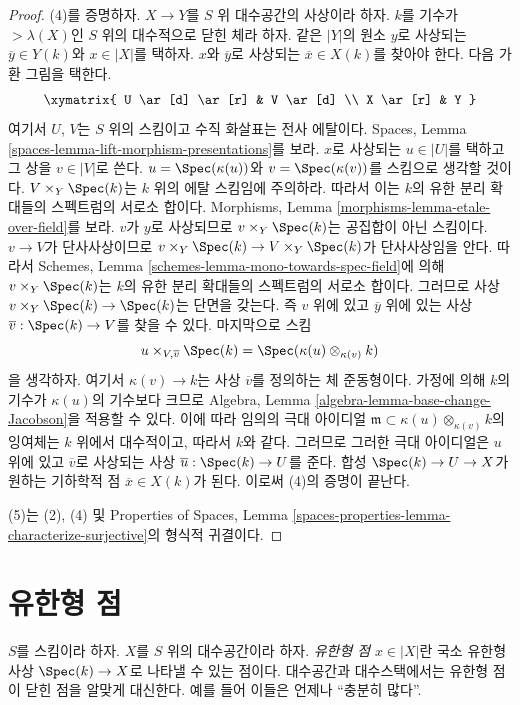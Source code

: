 \begin{proof}
\medskip\noindent
(4)를 증명하자. $X \to Y$를 $S$ 위 대수공간의 사상이라 하자.
$k$를 기수가 $> \lambda(X)$인 $S$ 위의 대수적으로 닫힌 체라 하자.
같은 $|Y|$의 원소 $y$로 사상되는 $\overline{y} \in Y(k)$와
$x \in |X|$를 택하자.
$x$와 $\overline{y}$로 사상되는 $\overline{x} \in X(k)$를 찾아야 한다.
다음 가환 그림을 택한다.
$$
\xymatrix{
U \ar[d] \ar[r] & V \ar[d] \\
X \ar[r] & Y
}
$$
여기서 $U$, $V$는 $S$ 위의 스킴이고 수직 화살표는 전사 에탈이다.
Spaces, Lemma \ref{spaces-lemma-lift-morphism-presentations}를 보라.
$x$로 사상되는 $u \in |U|$를 택하고 그 상을 $v \in |V|$로 쓴다.
$u = \Spec(\kappa(u))$와 $v = \Spec(\kappa(v))$를 스킴으로 생각할 것이다.
$V \times_Y \Spec(k)$는 $k$ 위의 에탈 스킴임에 주의하라.
따라서 이는 $k$의 유한 분리 확대들의 스펙트럼의 서로소 합이다.
Morphisms, Lemma \ref{morphisms-lemma-etale-over-field}를 보라.
$v$가 $y$로 사상되므로 $v \times_Y \Spec(k)$는 공집합이 아닌
스킴이다. $v \to V$가 단사사상이므로
$v \times_Y \Spec(k) \to V \times_Y \Spec(k)$가 단사사상임을 안다.
따라서 Schemes, Lemma
\ref{schemes-lemma-mono-towards-spec-field}에 의해
$v \times_Y \Spec(k)$는 $k$의 유한 분리 확대들의 스펙트럼의 서로소 합이다.
그러므로 사상
$v \times_Y \Spec(k) \to \Spec(k)$는 단면을 갖는다. 즉 $v$ 위에 있고
$\overline{y}$ 위에 있는 사상 $\overline{v} : \Spec(k) \to V$를
찾을 수 있다. 마지막으로 스킴
$$
u \times_{V, \overline{v}} \Spec(k)
=
\Spec(\kappa(u) \otimes_{\kappa(v)} k)
$$
을 생각하자. 여기서 $\kappa(v) \to k$는 사상 $\overline{v}$를
정의하는 체 준동형이다. 가정에 의해 $k$의 기수가 $\kappa(u)$의
기수보다 크므로 Algebra, Lemma
\ref{algebra-lemma-base-change-Jacobson}을 적용할 수 있다. 이에 따라
임의의 극대 아이디얼
$\mathfrak m \subset \kappa(u) \otimes_{\kappa(v)} k$의 잉여체는
$k$ 위에서 대수적이고, 따라서 $k$와 같다.
그러므로 그러한 극대 아이디얼은 $u$ 위에 있고 $\overline{v}$로
사상되는 사상 $\overline{u} : \Spec(k) \to U$를 준다.
합성 $\Spec(k) \to U \to X$가 원하는 기하학적 점
$\overline{x} \in X(k)$가 된다. 이로써 (4)의 증명이 끝난다.

\medskip\noindent
(5)는 (2), (4) 및 Properties of Spaces, Lemma
\ref{spaces-properties-lemma-characterize-surjective}의 형식적 귀결이다.
\end{proof}

\section{유한형 점}
\label{section-points-finite-type}

\noindent
$S$를 스킴이라 하자. $X$를 $S$ 위의 대수공간이라 하자.
{\it 유한형 점} $x \in |X|$란 국소 유한형 사상
$\Spec(k) \to X$로 나타낼 수 있는 점이다.
대수공간과 대수스택에서는 유한형 점이 닫힌 점을 알맞게 대신한다.
예를 들어 이들은 언제나 “충분히 많다”.

